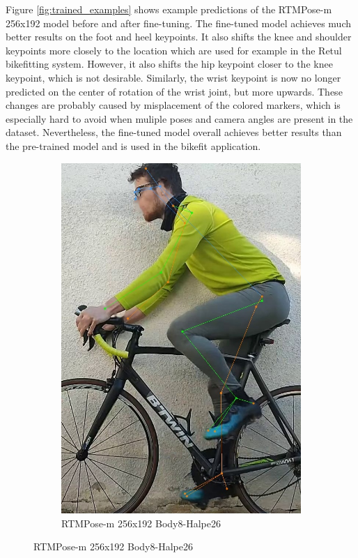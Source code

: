 Figure \ref{fig:trained_examples} shows example predictions of the RTMPose-m 256x192 model before and after fine-tuning. The fine-tuned model achieves much better results on the foot and heel keypoints. It also shifts the knee and shoulder keypoints more closely to the location which are used for example in the Retul bikefitting system. However, it also shifts the hip keypoint closer to the knee keypoint, which is not desirable. Similarly, the wrist keypoint is now no longer predicted on the center of rotation of the wrist joint, but more upwards. These changes are probably caused by misplacement of the colored markers, which is especially hard to avoid when muliple poses and camera angles are present in the dataset. Nevertheless, the fine-tuned model overall achieves better results than the pre-trained model and is used in the bikefit application.
\begin{figure}[htbp]
    \centering
    \begin{subfigure}[t]{\imgwidth}
        \centering

        \includegraphics[width=\smallimgwidth]{obrazky-figures/rtmpose-m_8xb512-700e_body8-halpe26-256x192_zlute_196_crop.jpg}
        \caption{RTMPose-m 256x192 Body8-Halpe26}


\end{subfigure}
\end{figure}
